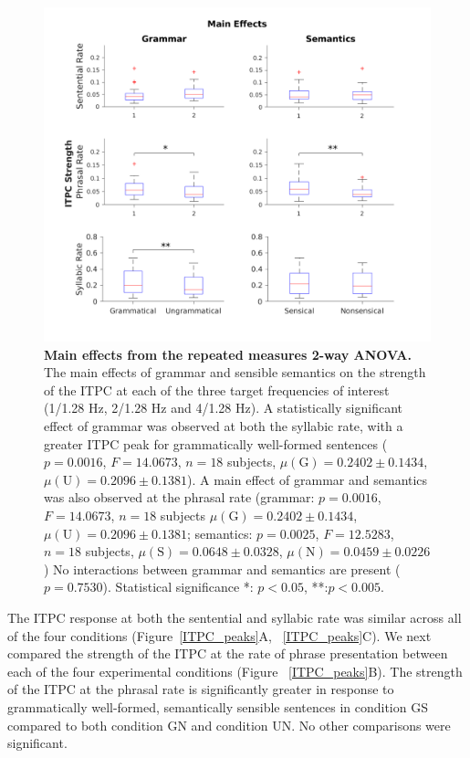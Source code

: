 \documentclass[a4paper,10pt,twoside]{article}
\begin{document}

\begin{figure}[tbp]
\includegraphics[width=\linewidth]{BoxPlots_main_effects.png}
\caption{\textbf{Main effects from the repeated measures 2-way ANOVA.}
  The main effects of grammar and sensible semantics on the strength
  of the ITPC at each of the three target frequencies of interest
  (1/1.28 Hz, 2/1.28 Hz and 4/1.28 Hz). A statistically significant
  effect of grammar was observed at both the syllabic rate, with a
  greater ITPC peak for grammatically well-formed sentences
  ($p=0.0016$, $F=14.0673$, $n=18$ subjects, $\mu(\mathrm{G}) = 0.2402
  \pm 0.1434$, $\mu(\mathrm{U}) = 0.2096 \pm 0.1381$).  A main effect
  of grammar and semantics was also observed at the phrasal rate
  (grammar: $p=0.0016$, $F=14.0673$, $n=18$ subjects $\mu(\mathrm{G})= 0.2402
  \pm 0.1434$, $\mu(\mathrm{U})= 0.2096 \pm 0.1381$; semantics: $p=0.0025$,
  $F=12.5283$, $n=18$ subjects, $\mu(\mathrm{S}) = 0.0648 \pm
  0.0328$, $\mu(\mathrm{N}) = 0.0459 \pm 0.0226$) No interactions
  between grammar and semantics are present ($p=0.7530$). Statistical
  significance *: $p<0.05$, **:$p<0.005$.  }
\label{MainEffects}
\end{figure}

The ITPC response at both the sentential and syllabic rate was similar
across all of the four conditions (Figure~\ref{ITPC_peaks}A,
~\ref{ITPC_peaks}C). We next compared the strength of the ITPC at the
rate of phrase presentation between each of the four experimental
conditions (Figure ~\ref{ITPC_peaks}B). The strength of the ITPC at
the phrasal rate is significantly greater in response to grammatically
well-formed, semantically sensible sentences in condition GS compared
to both condition GN and condition UN. No other comparisons were
significant.
\end{document}
